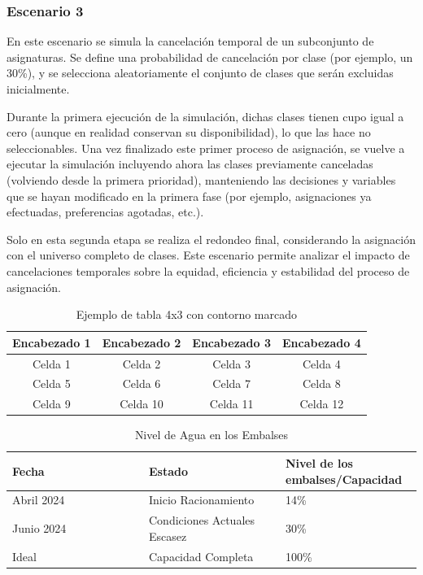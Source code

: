 \documentclass{article}
\begin{document}
\subsubsection{Escenario 3}

En este escenario se simula la cancelación temporal de un subconjunto de asignaturas. Se define 
una probabilidad de cancelación por clase (por ejemplo, un 30\%), y se selecciona aleatoriamente 
el conjunto de clases que serán excluidas inicialmente.

Durante la primera ejecución de la simulación, dichas clases tienen cupo igual a cero 
(aunque en realidad conservan su disponibilidad), lo que las hace no seleccionables. Una vez 
finalizado este primer proceso de asignación, se vuelve a ejecutar la simulación 
incluyendo ahora las clases previamente canceladas (volviendo desde la primera prioridad), 
manteniendo las decisiones y variables 
que se hayan modificado en la primera fase (por ejemplo, asignaciones ya efectuadas, 
preferencias agotadas, etc.).

Solo en esta segunda etapa se realiza el redondeo final, considerando la asignación con el 
universo completo de clases. Este escenario permite analizar el impacto de cancelaciones 
temporales sobre la equidad, eficiencia y estabilidad del proceso de asignación.



\renewcommand{\tablename}{Tabla}
\begin{table}[htbp]
  \centering
  \caption{Ejemplo de tabla 4x3 con contorno marcado \label{tab:Prueba}}
  \begin{tabular}{|c|c|c|c|} %
    \hline
    Encabezado 1 & Encabezado 2 & Encabezado 3 & Encabezado 4 \\
    \hline
    Celda 1 & Celda 2 & Celda 3 & Celda 4 \\
    \hline
    Celda 5 & Celda 6 & Celda 7 & Celda 8 \\
    \hline
    Celda 9 & Celda 10 & Celda 11 & Celda 12 \\
    \hline
  \end{tabular}
\end{table}

\begin{table}[H]
\centering
\caption{Nivel de Agua en los Embalses}
\label{tab:NivelAgua}
\begin{tabular}{|p{0.333\linewidth}|p{0.333\linewidth}|p{0.333\linewidth}|}
\hline
\textbf{Fecha} & \textbf{Estado} & \textbf{Nivel de los embalses/Capacidad} \\
\hline
Abril 2024 & Inicio Racionamiento & 14\% \\
\hline
Junio 2024 & Condiciones Actuales Escasez & 30\% \\
\hline
Ideal & Capacidad Completa & 100\% \\
\hline
\end{tabular}
\end{table}
\end{document}
